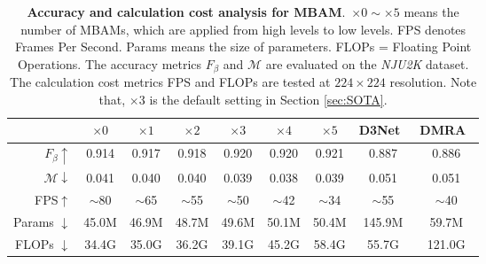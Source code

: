 \documentclass[journal]{IEEEtran}
\newcommand{\secref}[1]{Section \ref{#1}}
\newcommand{\DMRA}{DMRA~\cite{piao2019depth}}
\newcommand{\DTNet}{D3Net~\cite{fan2019D3Net}}
\begin{document}
\begin{table*}[t]
	\centering
	\small
	\renewcommand{\arraystretch}{1.2}
	\renewcommand{\tabcolsep}{4.5mm}
	\caption{\textbf{Accuracy and calculation cost analysis for MBAM}.\ $\times 0 \sim \times 5$ means the number of MBAMs, which are applied from high levels to low levels.
		FPS denotes Frames Per Second.
		Params means the size of parameters.
		FLOPs = Floating Point Operations.
		The accuracy metrics $F_{\beta}$ and $\mathcal{M}$ are evaluated on the \textit{NJU2K} dataset.
		The calculation cost metrics FPS and FLOPs are tested at $224 \times 224$ resolution.
		Note that, $\times$3 is  the default setting in \secref{sec:SOTA}.}
	\begin{tabular}{r|cccccc|cc}
		\hline\toprule
& $\times 0$ & $\times 1$  & $\times 2$ & $\times 3$  &  $\times 4$  &  $\times 5$ &\DTNet  &\DMRA \\
		\hline
		$F_{\beta}\uparrow$      & 0.914      &  0.917      &  0.918     & 0.920       &  0.920  &  0.921     & 0.887   & 0.886\\
		$\mathcal{M}\downarrow$  & 0.041      &  0.040      &  0.040     & 0.039       &  0.038  &  0.039     & 0.051   & 0.051\\
FPS$\uparrow$            & $\sim$80   &  $\sim$65   & $\sim$55   & $\sim$50    & $\sim$42&  $\sim$34  &$\sim$55 & $\sim$40 \\
		Params $\downarrow$      & 45.0M      &  46.9M      &  48.7M     & 49.6M       &  50.1M  &  50.4M     & 145.9M  &59.7M\\
		FLOPs  $\downarrow$      & 34.4G      &  35.0G      &  36.2G     & 39.1G       &  45.2G  &  58.4G     & 55.7G   &121.0G\\
\bottomrule
		\hline
	\end{tabular}
	\label{tab:MBAM}
\end{table*}
\end{document}
